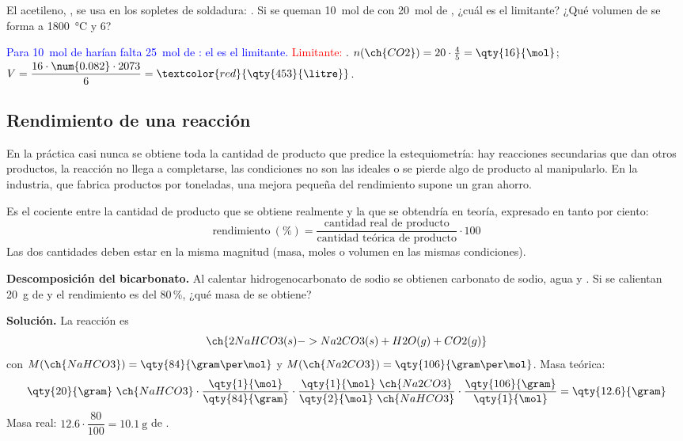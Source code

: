 \begin{exercise}
    El acetileno, , se usa en los sopletes de soldadura: . Si se queman
    \qty{10}{\mol} de  con \qty{20}{\mol} de , ¿cuál es el limitante? ¿Qué volumen de  se forma a
    \qty{1800}{\degreeCelsius} y \qty{6}{\atm}?
    \begin{solu}
        \textcolor{blue}{Para \qty{10}{\mol} de  harían falta \qty{25}{\mol} de : el  es el limitante.}
        \textcolor{red}{Limitante: }. \(n(\ch{CO2}) = 20 \cdot \frac{4}{5} = \qty{16}{\mol}\);
        \(V = \dfrac{16 \cdot \num{0.082} \cdot 2073}{6} = \textcolor{red}{\qty{453}{\litre}}\).
    \end{solu}
\end{exercise}

\subsection{Rendimiento de una reacción}

En la práctica casi nunca se obtiene toda la cantidad de producto que predice la estequiometría: hay reacciones secundarias que
dan otros productos, la reacción no llega a completarse, las condiciones no son las ideales o se pierde algo de producto al
manipularlo. En la industria, que fabrica productos por toneladas, una mejora pequeña del rendimiento supone un gran ahorro.

\begin{definition}[Rendimiento]
    Es el cociente entre la cantidad de producto que se obtiene realmente y la que se obtendría en teoría, expresado en tanto por
    ciento:
    \[ \text{rendimiento}\ (\%) = \frac{\text{cantidad real de producto}}{\text{cantidad teórica de producto}} \cdot 100 \]
    Las dos cantidades deben estar en la misma magnitud (masa, moles o volumen en las mismas condiciones).
\end{definition}

\begin{example}
    \textbf{Descomposición del bicarbonato.} Al calentar hidrogenocarbonato de sodio se obtienen carbonato de sodio, agua y
    . Si se calientan \qty{20}{\gram} de  y el rendimiento es del 80\,\%, ¿qué masa de  se obtiene?

    \textbf{Solución.} La reacción es
    \[ \ch{2 NaHCO3(s) -> Na2CO3(s) + H2O(g) + CO2(g)} \]
    con \(M(\ch{NaHCO3}) = \qty{84}{\gram\per\mol}\) y \(M(\ch{Na2CO3}) = \qty{106}{\gram\per\mol}\). Masa teórica:
    \[ \qty{20}{\gram}\ \ch{NaHCO3} \cdot \frac{\qty{1}{\mol}}{\qty{84}{\gram}} \cdot \frac{\qty{1}{\mol}\ \ch{Na2CO3}}{\qty{2}{\mol}\ \ch{NaHCO3}}
    \cdot \frac{\qty{106}{\gram}}{\qty{1}{\mol}} = \qty{12.6}{\gram} \]
    Masa real: \(\num{12.6} \cdot \dfrac{80}{100} = \qty{10.1}{\gram}\) de .
\end{example}

